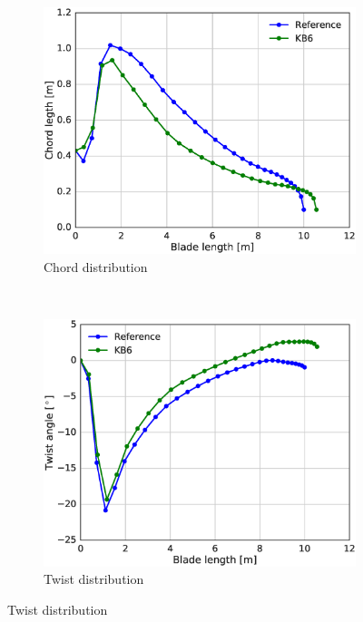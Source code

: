 \begin{figure}[tph]
\begin{subfigure}{0.50\textwidth}
\includegraphics[width=\linewidth]{figures/KB6_final/KB6_chord.eps}
\caption{Chord distribution}
\label{subfig:KB6_chord}
\end{subfigure}
 ~
\begin{subfigure}{0.50\textwidth}
\includegraphics[width=\linewidth]{figures/KB6_final/KB6_twist.eps}
\caption{Twist distribution}
\label{subfig:KB6_twist}
\end{subfigure}


\end{figure}
